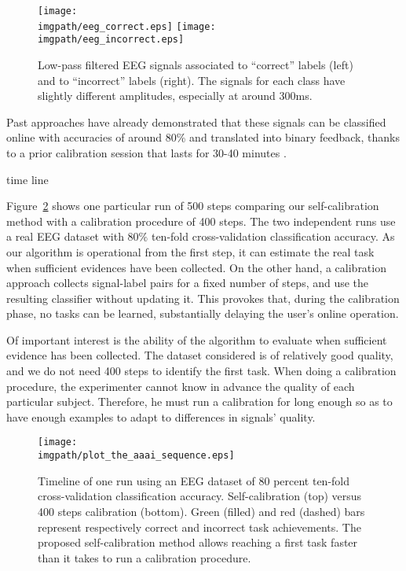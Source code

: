 \begin{figure}[!htbp]
\centering
\texttt{[image: \\imgpath/eeg\_correct.eps]}
\texttt{[image: \\imgpath/eeg\_incorrect.eps]}
\caption{Low-pass filtered EEG signals associated to ``correct'' labels (left) and to ``incorrect'' labels (right). The signals for each class have slightly different amplitudes, especially at around 300ms.}
\label{fig:EEGsample}
\end{figure}

Past approaches have already demonstrated that these signals can be classified online with accuracies of around 80\% and translated into binary feedback, thanks to a prior calibration session that lasts for 30-40 minutes \cite{chavarriaga2010learning, iturrate2013task}.

time line

Figure~\ref{fig:sequence} shows one particular run of 500 steps comparing our self-calibration method with a calibration procedure of 400 steps. The two independent runs use a real EEG dataset with $80\%$ ten-fold cross-validation classification accuracy. As our algorithm is operational from the first step, it can estimate the real task when sufficient evidences have been collected. On the other hand, a calibration approach collects signal-label pairs for a fixed number of steps, and use the resulting classifier without updating it. This provokes that, during the calibration phase, no tasks can be learned, substantially delaying the user's online operation.

Of important interest is the ability of the algorithm to evaluate when sufficient evidence has been collected. The dataset considered is of relatively good quality, and we do not need 400 steps to identify the first task. When doing a calibration procedure, the experimenter cannot know in advance the quality of each particular subject. Therefore, he must run a calibration for long enough so as to have enough examples to adapt to differences in signals' quality.


\begin{figure}[!htbp]
\centering
\texttt{[image: \\imgpath/plot\_the\_aaai\_sequence.eps]}
\caption{Timeline of one run using an EEG dataset of $80$ percent ten-fold cross-validation classification accuracy. Self-calibration (top) versus 400 steps calibration (bottom). Green (filled) and red (dashed) bars represent respectively correct and incorrect task achievements. The proposed self-calibration method allows reaching a first task faster than it takes to run a calibration procedure.}
\label{fig:sequence}
\end{figure}


